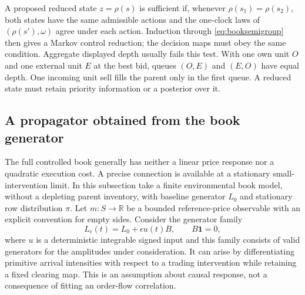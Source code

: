 \documentclass[11pt]{article}
\numberwithin{equation}{section}
\theoremstyle{definition}
\theoremstyle{remark}
\newcommand{\R}{\mathbb{R}}
\theoremstyle{definition}
\begin{document}
A proposed reduced state $z=\rho(s)$ is sufficient if, whenever
$\rho(s_1)=\rho(s_2)$, both states have the same admissible actions and the
one-clock laws of $(\rho(s'),\omega)$ agree under each action. Induction
through \eqref{eq:booksemigroup} then gives a Markov control reduction; the
decision maps must obey the same condition. Aggregate displayed depth
usually fails this test. With one own unit $O$ and one external unit $E$
at the best bid, queues $(O,E)$ and $(E,O)$ have equal depth. One incoming
unit sell fills the parent only in the first queue. A reduced state must
retain priority information or a posterior over it.

\subsection{A propagator obtained from the book generator}

The full controlled book generally has neither a linear price response nor
a quadratic execution cost. A precise connection is available at a
stationary small-intervention limit. In this subsection take a finite
environmental book model, without a depleting parent inventory, with baseline
generator $L_0$ and stationary row distribution $\pi$. Let $m:S\to\R$ be
a bounded reference-price observable with an explicit convention for empty
sides. Consider the generator family
\[
 L_\epsilon(t)=L_0+\epsilon u(t)B,
 \qquad B\mathbf 1=0,
\]
where $u$ is a deterministic integrable signed input and this family consists
of valid generators for the amplitudes under consideration. It can arise by
differentiating primitive arrival intensities with respect to a trading
intervention while retaining a fixed clearing map. This is an assumption
about causal response, not a consequence of fitting an order-flow correlation.
\end{document}
